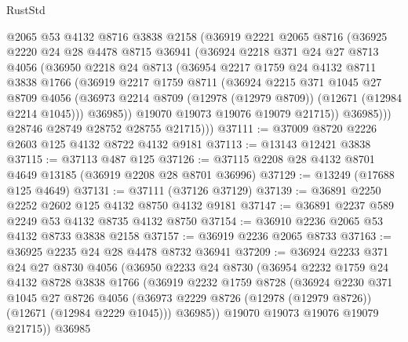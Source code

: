 \begin{lexlean}{RustStd}
\begin{coremodule}
          @2065
          @53
          @4132
          @8716
          @3838
          @2158
          (@36919
            @2221
            @2065
            @8716
            (@36925
              @2220
              @24
              @28
              @4478
              @8715
              @36941
              (@36924
                @2218
                @371
                @24
                @27
                @8713
                @4056
                (@36950
                  @2218
                  @24
                  @8713
                  (@36954
                    @2217
                    @1759
                    @24
                    @4132
                    @8711
                    @3838
                    @1766
                    (@36919
                      @2217
                      @1759
                      @8711
                      (@36924
                        @2215
                        @371
                        @1045
                        @27
                        @8709
                        @4056
                        (@36973 @2214 @8709 (@12978 (@12979 @8709)) (@12671 (@12984 @2214 @1045)))
                        @36985))
                    @19070
                    @19073
                    @19076
                    @19079
                    @21715))
                @36985)))
          @28746
          @28749
          @28752
          @28755
          @21715)))
@37111 := @37009 @8720 @2226 @2603 @125 @4132 @8722 @4132 @9181
@37113 := @13143 @12421 @3838
@37115 := @37113 @487 @125
@37126 := @37115 @2208 @28 @4132 @8701 @4649 @13185 (@36919 @2208 @28 @8701 @36996)
@37129 := @13249 (@17688 @125 @4649)
@37131 := @37111 (@37126 @37129)
@37139 := @36891 @2250 @2252 @2602 @125 @4132 @8750 @4132 @9181
@37147 := @36891 @2237 @589 @2249 @53 @4132 @8735 @4132 @8750
@37154 := @36910 @2236 @2065 @53 @4132 @8733 @3838 @2158
@37157 := @36919 @2236 @2065 @8733
@37163 := @36925 @2235 @24 @28 @4478 @8732 @36941
@37209 := @36924
    @2233
    @371
    @24
    @27
    @8730
    @4056
    (@36950
      @2233
      @24
      @8730
      (@36954
        @2232
        @1759
        @24
        @4132
        @8728
        @3838
        @1766
        (@36919
          @2232
          @1759
          @8728
          (@36924
            @2230
            @371
            @1045
            @27
            @8726
            @4056
            (@36973 @2229 @8726 (@12978 (@12979 @8726)) (@12671 (@12984 @2229 @1045)))
            @36985))
        @19070
        @19073
        @19076
        @19079
        @21715))
    @36985

\end{coremodule}
\end{lexlean}
